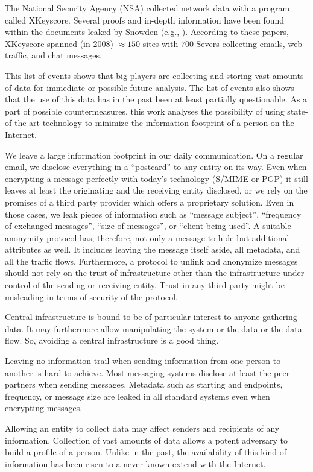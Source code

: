 \documentclass[10pt,journal,compsoc]{IEEEtran}
\begin{document}
The National Security Agency (NSA) collected network data with a program called XKeyscore. Several proofs and in-depth information have been found within the documents leaked by Snowden (e.g., \cite{XKeyscore}). According to these papers, XKeyscore spanned (in 2008) $\approx150$ sites with $700$ Severs collecting emails, web traffic, and chat messages.

This list of events shows that big players are collecting and storing vast amounts of data for immediate or possible future analysis. The list of events also shows that the use of this data has in the past been at least partially questionable. As a part of possible countermeasures, this work analyses the possibility of using state-of-the-art technology to minimize the information footprint of a person on the Internet. 

We leave a large information footprint in our daily communication. On a regular email, we disclose everything in a ``postcard'' to any entity on its way. Even when encrypting a message perfectly with today's technology (S/MIME\cite{RFC2045} or PGP\cite{RFC2015}) it still leaves at least the originating and the receiving entity disclosed, or we rely on the promises of a third party provider which offers a proprietary solution. Even in those cases, we leak pieces of information such as ``message subject'', ``frequency of exchanged messages'', ``size of messages'', or ``client being used''. A suitable anonymity protocol has, therefore, not only a message to hide but additional attributes as well. It includes leaving the message itself aside, all metadata, and all the traffic flows. Furthermore, a protocol to unlink and anonymize messages should not rely on the trust of infrastructure other than the infrastructure under control of the sending or receiving entity. Trust in any third party might be misleading in terms of security of the protocol.

Central infrastructure is bound to be of particular interest to anyone gathering data. It may furthermore allow manipulating the system or the data or the data flow. So, avoiding a central infrastructure is a good thing.

Leaving no information trail when sending information from one person to another is hard to achieve. Most messaging systems disclose at least the peer partners when sending messages. Metadata such as starting and endpoints, frequency, or message size are leaked in all standard systems even when encrypting messages.

Allowing an entity to collect data may affect senders and recipients of any information. Collection of vast amounts of data allows a potent adversary to build a  profile of a person. Unlike in the past, the availability of this kind of information has been risen to a never known extend with the Internet.
\end{document}
